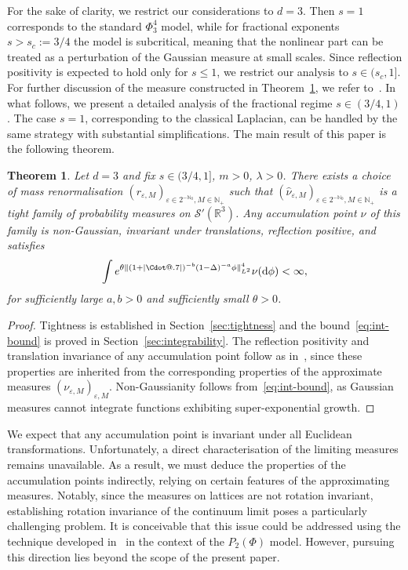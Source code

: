 \documentclass{article}
\makeatletter
\numberwithin{equation}{section}
\newcommand{\assign}{:=}
\newcommand{\mathd}{\mathrm{d}}
\newcommand*\Cdot{{\mathpalette\Cdot@{.7}}}
\newcommand*\Cdot@[2]{\mathbin{\vcenter{\hbox{\scalebox{#2}{\hspace{0.1mm}$\m@th#1\bullet$\hspace{0.1mm}}}}}}
\theoremstyle{plain}
\newtheorem{theorem}{Theorem}[section]
\theoremstyle{definition}
\makeatother
\begin{document}
For the sake of clarity, we restrict our considerations to $d = 3$. Then $s =
1$ corresponds to the standard $\Phi_3^4$ model, while for fractional
exponents $s > s_c \assign 3 / 4$ the model is subcritical, meaning that the
nonlinear part can be treated as a perturbation of the Gaussian measure at
small scales. Since reflection positivity is expected to hold only for $s
\leqslant 1$, we restrict our analysis to $s \in (s_c, 1]$. For further
discussion of the measure constructed in Theorem~\ref{thm:main}, we refer
to~{\cite{GH21}}. In what follows, we present
a detailed analysis of the fractional regime $s \in (3 / 4, 1)$. The case $s =
1$, corresponding to the classical Laplacian, can be handled by the same
strategy with substantial simplifications. The main result of this paper is the
following theorem.

\begin{theorem}
  \label{thm:main}Let $d = 3$ and fix $s \in (3 / 4, 1]$, $m > 0$, $\lambda >
  0$. There exists a choice of mass renormalisation
  $(r_{\varepsilon, M})_{\varepsilon \in 2^{-\mathbb{N}_0}, M \in
  \mathbb{N}_+}$ such that $(\hat{\nu}_{\varepsilon, M})_{\varepsilon \in
  2^{-\mathbb{N}_0}, M \in \mathbb{N}_+}$ is a tight family of probability
  measures on $\mathcal{S}' (\mathbb{R}^3)$. Any accumulation point $\nu$ of
  this family is non-Gaussian, invariant under translations, reflection
  positive, and satisfies
  \begin{equation}
    \int e^{\theta \| (1 + | \Cdot |)^{- b}  (1 - \Delta )^{- a} \phi
    \|_{L^2}^4} \nu (\mathd \phi) < \infty, \label{eq:int-bound}
  \end{equation}
  for sufficiently large $a, b > 0$ and sufficiently small $\theta > 0$.
\end{theorem}

\begin{proof}
  Tightness is established in Section~\ref{sec:tightness} and
  the bound~\eqref{eq:int-bound} is proved in Section~\ref{sec:integrability}.
  The reflection positivity and translation invariance of any accumulation
  point follow as in~{\cite{GH21}}, since
  these properties are inherited from the corresponding properties of the
  approximate measures $(\nu_{\varepsilon, M})_{\varepsilon, M}$.
  Non-Gaussianity follows from~\eqref{eq:int-bound}, as Gaussian measures
  cannot integrate functions exhibiting super-exponential growth.
\end{proof}

We expect that any accumulation point is invariant under all
Euclidean transformations. Unfortunately, a direct characterisation of the
limiting measures remains unavailable. As a result, we must deduce the
properties of the accumulation points indirectly, relying on certain features
of the approximating measures. Notably, since the measures on lattices are not
rotation invariant, establishing rotation invariance of the continuum
limit poses a particularly challenging problem. It is conceivable that this
issue could be addressed using the technique developed
in~{\cite{duchStochasticQuantizationTwoDimensional2024}} in the context of
the $P_2 (\Phi)$ model. However, pursuing this direction lies beyond the scope of
the present paper.
\end{document}
